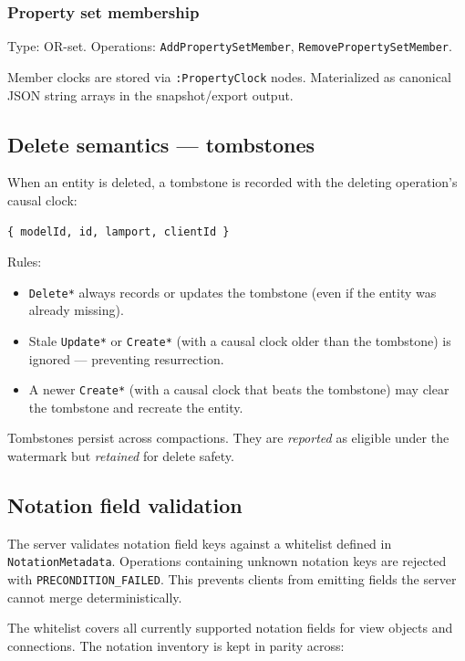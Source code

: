 \subsubsection{Property set membership}

Type: OR-set. Operations: \texttt{AddPropertySetMember},
\texttt{RemovePropertySetMember}.

Member clocks are stored via \texttt{:PropertyClock} nodes.
Materialized as canonical JSON string arrays in the snapshot/export output.

\subsection{Delete semantics --- tombstones}

When an entity is deleted, a tombstone is recorded with the deleting
operation's causal clock:

\begin{lstlisting}[caption={Tombstone record}]
{ modelId, id, lamport, clientId }
\end{lstlisting}

Rules:

\begin{itemize}
\item \texttt{Delete*} always records or updates the tombstone (even if the
  entity was already missing).
\item Stale \texttt{Update*} or \texttt{Create*} (with a causal clock older
  than the tombstone) is ignored --- preventing resurrection.
\item A newer \texttt{Create*} (with a causal clock that beats the tombstone)
  may clear the tombstone and recreate the entity.
\end{itemize}

Tombstones persist across compactions. They are \emph{reported} as eligible
under the watermark but \emph{retained} for delete safety.

\subsection{Notation field validation}

The server validates notation field keys against a whitelist defined in
\texttt{NotationMetadata}. Operations containing unknown notation keys are
rejected with \texttt{PRECONDITION\_FAILED}. This prevents clients from
emitting fields the server cannot merge deterministically.

The whitelist covers all currently supported notation fields for view objects
and connections. The notation inventory is kept in parity across:

